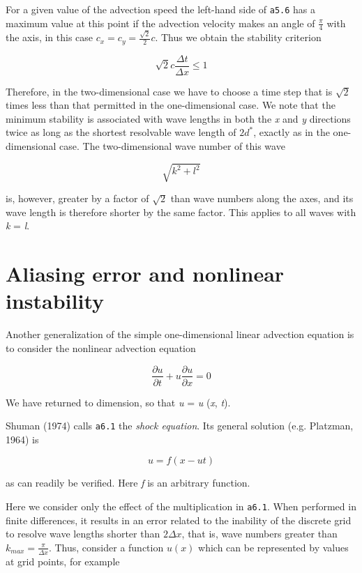 For a given value of the advection speed the left-hand side of
\texttt{a5.6} has a maximum value at this point if the advection
velocity makes an angle of \(\frac{\pi}{4}\) with the axis, in this case
\(c_{x} = c_{y} = \frac{\sqrt{2}}{2}c\). Thus we obtain the stability
criterion

\[\sqrt{2}c\frac{\Delta t}{\Delta x} \leq 1\]

Therefore, in the two-dimensional case we have to choose a time step
that is \(\sqrt{2}\) times less than that permitted in the
one-dimensional case. We note that the minimum stability is associated
with wave lengths in both the \emph{x} and \emph{y} directions twice as
long as the shortest resolvable wave length of \({2d}^{*}\), exactly as
in the one-dimensional case. The two-dimensional wave number of this
wave

\[\sqrt{k^{2} + l^{2}}\]

is, however, greater by a factor of \(\sqrt{2}\) than wave numbers along
the axes, and its wave length is therefore shorter by the same factor.
This applies to all waves with \emph{k} = \emph{l}.

\section{Aliasing error and nonlinear
instability}\label{sec:aliasing-error-and-nonlinear-instability}

Another generalization of the simple one-dimensional linear advection
equation is to consider the nonlinear advection equation

\[\frac{\partial u}{\partial t} + u\frac{\partial u}{\partial x} = 0\]

We have returned to dimension, so that \emph{u} = \emph{u} (\emph{x},
\emph{t}).

Shuman (1974) calls \texttt{a6.1} the \emph{shock equation}. Its general
solution (e.g. Platzman, 1964) is

\[u = f\left( x - ut \right)\]

as can readily be verified. Here \emph{f} is an arbitrary function.

Here we consider only the effect of the multiplication in \texttt{a6.1}.
When performed in finite differences, it results in an error related to
the inability of the discrete grid to resolve wave lengths shorter than
\(2\Delta x\), that is, wave numbers greater than
\(k_{max} = \frac{\pi}{\Delta x}\). Thus, consider a function
\(u\left( x \right)\) which can be represented by values at grid points,
for example

